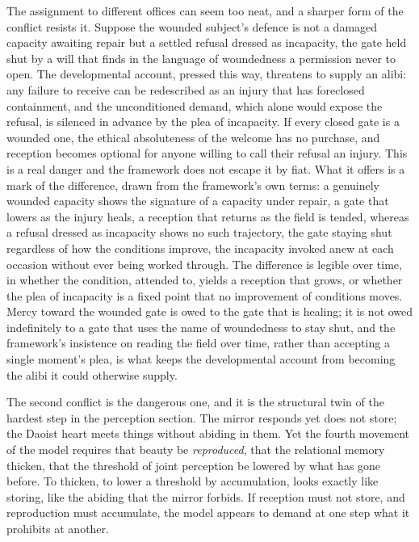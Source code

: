 The assignment to different offices can seem too neat, and a sharper form of the conflict resists it. Suppose the wounded subject's defence is not a damaged capacity awaiting repair but a settled refusal dressed as incapacity, the gate held shut by a will that finds in the language of woundedness a permission never to open. The developmental account, pressed this way, threatens to supply an alibi: any failure to receive can be redescribed as an injury that has foreclosed containment, and the unconditioned demand, which alone would expose the refusal, is silenced in advance by the plea of incapacity. If every closed gate is a wounded one, the ethical absoluteness of the welcome has no purchase, and reception becomes optional for anyone willing to call their refusal an injury. This is a real danger and the framework does not escape it by fiat. What it offers is a mark of the difference, drawn from the framework's own terms: a genuinely wounded capacity shows the signature of a capacity under repair, a gate that lowers as the injury heals, a reception that returns as the field is tended, whereas a refusal dressed as incapacity shows no such trajectory, the gate staying shut regardless of how the conditions improve, the incapacity invoked anew at each occasion without ever being worked through. The difference is legible over time, in whether the condition, attended to, yields a reception that grows, or whether the plea of incapacity is a fixed point that no improvement of conditions moves. Mercy toward the wounded gate is owed to the gate that is healing; it is not owed indefinitely to a gate that uses the name of woundedness to stay shut, and the framework's insistence on reading the field over time, rather than accepting a single moment's plea, is what keeps the developmental account from becoming the alibi it could otherwise supply.

The second conflict is the dangerous one, and it is the structural twin of the hardest step in the perception section. The mirror responds yet does not store; the Daoist heart meets things without abiding in them. Yet the fourth movement of the model requires that beauty be \emph{reproduced}, that the relational memory thicken, that the threshold of joint perception be lowered by what has gone before. To thicken, to lower a threshold by accumulation, looks exactly like storing, like the abiding that the mirror forbids. If reception must not store, and reproduction must accumulate, the model appears to demand at one step what it prohibits at another.

